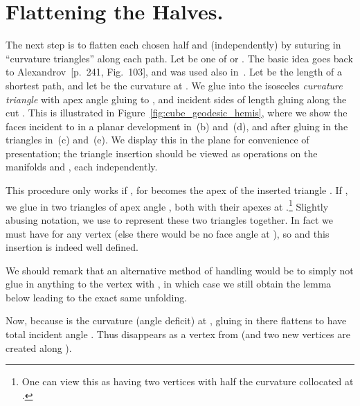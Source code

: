 \pdfoutput=1  \documentclass[]{article}
\newcommand{\figref}[1]{\ref{fig:#1}}
\begin{document}
\section{Flattening the Halves.}
The next step is to flatten each chosen
half  and  (independently) 
by suturing in ``curvature triangles''
along each  path.
Let  be one of  or .
The basic idea goes back to Alexandrov~\cite{a-cp-05}[p.~241, Fig.~103],
and was used also in~\cite{iv-cfpcs-08}.
Let  be the length  of a shortest path,
and let  be the curvature at .
We glue into  the isosceles \emph{curvature triangle}
 with apex angle  gluing
to ,
and incident sides of length  gluing along the cut . This is illustrated in
Figure~\figref{cube_geodesic_hemis}, where we show the faces
incident to  in a planar development in~(b) and~(d),
and after gluing in the triangles in~(c) and~(e).
We display this in the plane for convenience of presentation;
the triangle insertion should be viewed as operations on the manifolds
 and , each independently.


This procedure only works if , for  becomes the apex of the
inserted triangle .
If , we glue in two triangles of apex angle , both with their
apexes at .\footnote{
   One can view this as having two vertices with half
   the curvature collocated at .
}
Slightly abusing notation, we use  to represent
these two triangles together.  
In fact we must have  for any vertex 
(else there would be no face angle at ),
so  and this insertion is indeed well defined.

We should remark that an alternative method of handling 
would be to simply not glue in anything to the 
vertex  with , in which
case we still obtain the lemma below leading to the exact same unfolding.

Now, because  is the curvature (angle deficit) at , gluing in 
there flattens  to have total incident angle .
Thus  disappears as a vertex from  (and two new vertices are created along ).
\end{document}
